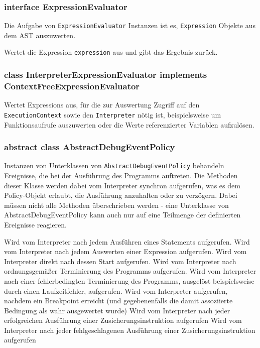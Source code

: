 \subsubsection{interface ExpressionEvaluator}
Die Aufgabe von \texttt{ExpressionEvaluator} Instanzen ist es, \texttt{Expression} Objekte aus dem AST auszuwerten.
\begin{description}
    Wertet die Expression \texttt{expression} aus und gibt das Ergebnis zurück.
\end{description}

\subsubsection{class InterpreterExpressionEvaluator implements ContextFreeExpressionEvaluator}
Wertet Expressions aus, für die zur Auswertung Zugriff auf den \texttt{ExecutionContext} sowie den \texttt{Interpreter} nötig ist, beispielsweise um Funktionsaufrufe auszuwerten oder die Werte referenzierter Variablen aufzulösen.

\subsubsection{abstract class AbstractDebugEventPolicy}
Instanzen von Unterklassen von \texttt{AbstractDebugEventPolicy} behandeln Ereignisse, die bei der Ausführung des Programms auftreten. Die Methoden dieser Klasse werden dabei vom Interpreter synchron aufgerufen, was es dem Policy-Objekt erlaubt, die Ausführung anzuhalten oder zu verzögern. Dabei müssen nicht alle Methoden überschrieben werden - eine Unterklasse von AbstractDebugEventPolicy kann auch nur auf eine Teilmenge der definierten Ereignisse reagieren.

\begin{description}
    Wird vom Interpreter nach jedem Ausführen eines Statements aufgerufen.
    Wird vom Interpreter nach jedem Auswerten einer Expression aufgerufen.
    Wird vom Interpreter direkt nach dessen Start aufgerufen.
    Wird vom Interpreter nach ordnungsgemäßer Terminierung des Programms aufgerufen.
    Wird vom Interpreter nach einer fehlerbedingten Terminierung des Programms, ausgelöst beispielsweise durch einen Laufzeitfehler, aufgerufen.
    Wird vom Interpreter aufgerufen, nachdem ein Breakpoint erreicht (und gegebenenfalls die damit assoziierte Bedingung als wahr ausgewertet wurde)
    Wird vom Interpreter nach jeder erfolgreichen Ausführung einer Zusicherungsinstruktion aufgerufen
    Wird vom Interpreter nach jeder fehlgeschlagenen Ausführung einer Zusicherungsinstruktion aufgerufen
\end{description}
